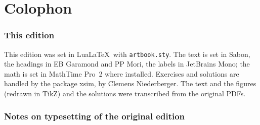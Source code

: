 \chapter*{Colophon}

\subsection*{This edition}

This edition was set in Lua\LaTeX\ with \texttt{artbook.sty}. The text is set
in Sabon, the headings in EB Garamond and PP Mori, the labels in JetBrains Mono;
the math is set in MathTime Pro~2 where installed. Exercises and solutions are
handled by the package xsim, by Clemens Niederberger. The text and the figures
(redrawn in TikZ) and the solutions were transcribed from the original PDFs.

\subsection*{Notes on typesetting of the original edition}

